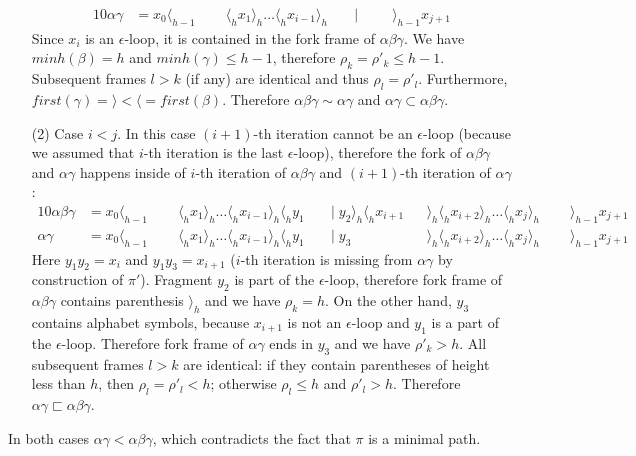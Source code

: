 \documentclass[AMA,STIX1COL]{WileyNJD-v2}
\newcommand{\Xl}{\langle}
\newcommand{\Xr}{\rangle}
\begin{document}
\begin{proofEnd}
\begin{enumerate}[itemsep=0.5em, topsep=0.5em]
\begin{alignat*}{10}
            \alpha \gamma       &= x_0 \Xl_{h-1} \;&&\; \Xl_h x_1 \Xr_h \hdots \Xl_h x_{i-1} \Xr_h \;&&\big|\;                   \;&&\; \Xr_{h-1} x_{j+1}
        \end{alignat*}
        Since $x_i$ is an $\epsilon$-loop, it is contained in the fork frame of $\alpha \beta \gamma$.
        We have $minh (\beta) = h$ and $minh (\gamma) \leq h - 1$, therefore $\rho_k = \rho'_k \leq h - 1$.
        Subsequent frames $l > k$ (if any) are identical and thus $\rho_l = \rho'_l$.
        Furthermore, $first (\gamma) = \Xr < \Xl = first (\beta)$.
        Therefore $\alpha \beta \gamma \sim \alpha \gamma$ and $\alpha \gamma \subset \alpha \beta \gamma$.

    \item[(2)]
        Case $i < j$.
        In this case $(i + 1)$-th iteration cannot be an $\epsilon$-loop
        (because we assumed that $i$-th iteration is the last $\epsilon$-loop),
        therefore the fork of $\alpha \beta \gamma$ and $\alpha \gamma$ happens
        inside of $i$-th iteration of $\alpha \beta \gamma$
        and $(i + 1)$-th iteration of $\alpha \gamma$:
        \begin{alignat*}{10}
            \alpha \beta \gamma &= x_0 \Xl_{h-1} \;&&\; \Xl_h x_1 \Xr_h \hdots \Xl_h x_{i-1} \Xr_h \Xl_h y_1 \;&&\big|\; y_2 \Xr_h \Xl_h x_{i+1} && \Xr_h \Xl_h x_{i+2} \Xr_h \hdots \Xl_h x_j \Xr_h \;&&\; \Xr_{h-1} x_{j+1} \\[-0.5em]
            \alpha \gamma       &= x_0 \Xl_{h-1} \;&&\; \Xl_h x_1 \Xr_h \hdots \Xl_h x_{i-1} \Xr_h \Xl_h y_1 \;&&\big|\; y_3                     && \Xr_h \Xl_h x_{i+2} \Xr_h \hdots \Xl_h x_j \Xr_h \;&&\; \Xr_{h-1} x_{j+1}
        \end{alignat*}
        Here $y_1 y_2 = x_i$ and $y_1 y_3 = x_{i+1}$ ($i$-th iteration is missing from $\alpha \gamma$ by construction of $\pi'$).
        Fragment $y_2$ is part of the $\epsilon$-loop,
        therefore fork frame of $\alpha \beta \gamma$ contains parenthesis $\Xr_h$ and we have $\rho_k = h$.
        On the other hand, $y_3$ contains alphabet symbols,
        because $x_{i+1}$ is not an $\epsilon$-loop and $y_1$ is a part of the $\epsilon$-loop.
        Therefore fork frame of $\alpha \gamma$ ends in $y_3$ and we have $\rho'_k > h$.
        All subsequent frames $l > k$ are identical:
        if they contain parentheses of height less than $h$, then $\rho_l = \rho'_l < h$;
        otherwise $\rho_l \leq h$ and $\rho'_l > h$.
        Therefore $\alpha \gamma \sqsubset \alpha \beta \gamma$.
    \end{enumerate}
    In both cases $\alpha \gamma < \alpha \beta \gamma$,
    which contradicts the fact that $\pi$ is a minimal path.
\end{proofEnd}
\end{document}
